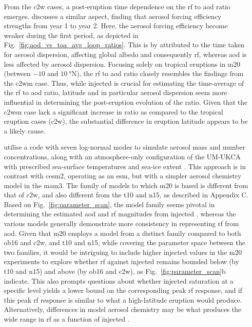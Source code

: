 \documentclass{ametsocV6.1}
\newcommand{\iso}[1][i]{{#1}njected \ce{SO2}}
\begin{document}
From the \gls{c2w} cases, a post-eruption time dependence on the \gls{rf} to \gls{aod}
ratio emerges. \citet{marshall2020} discusses a similar aspect, finding that aerosol
forcing efficiency strengths from year 1 to year 2. Here, the aerosol forcing efficiency
become weaker during the first period, as depicted in
Fig.~\ref{fig:aod_vs_toa_avg_loop_ratios}. This is by \citet{marshall2020} attributed to
the time taken for aerosol dispersion, affecting global albedo and consequently
\gls{rf}, whereas \gls{aod} is less affected by aerosol dispersion. Focusing solely on
tropical eruptions in \gls{m20} (between \(-10\) and \(\SI{10}{\degree\mathrm{N}}\)),
the \gls{rf} to \gls{aod} ratio closely resembles the findings from the \gls{c2wm} case.
Thus, while \iso{} is crucial for estimating the time-average of the \gls{rf} to
\gls{aod} ratio, latitude and in particular aerosol dispersion seem more influential in
determining the post-eruption evolution of the ratio. Given that the \gls{c2wsn} case
lack a significant increase in ratio as compared to the tropical eruption cases
(\gls{c2w}), the substantial difference in eruption latitude appears to be a likely
cause.

\citet{marshall2019, marshall2020, marshall2021} utilise a code with seven log-normal
modes to simulate aerosol mass and number concentrations, along with an atmosphere-only
configuration of the UM-UKCA with prescribed sea-surface temperatures and sea-ice extent
\citep{marshall2019}. This approach is in contrast with \gls{cesm2}, operating as an
\gls{esm}, but with a simpler aerosol chemistry model in the \gls{mam3}. The family of
models to which \gls{m20} is based is different from that of \gls{c2w}, and also
different from the \gls{t10} and \gls{n15}, as described in Appendix C. Based on
Fig.~\ref{fig:parameter_scan}, the model family seems pivotal in determining the
estimated \gls{aod} and \gls{rf} magnitudes from \iso{}, whereas the various models
generally demonstrate more consistency in representing \gls{rf} from \gls{aod}. Given
that \gls{m20} employs a model from a distinct family compared to both \gls{ob16} and
\gls{c2w}, and \gls{t10} and \gls{n15}, while covering the parameter space between the
two families, it would be intriguing to include higher \iso{} values in the \gls{m20}
experiments to explore whether \gls{rf} against \iso{} remains bounded below (by
\gls{t10} and \gls{n15}) and above (by \gls{ob16} and \gls{c2w}), as
Fig.~\ref{fig:parameter_scan}b indicate. This also prompts questions about whether
\iso{} saturation at a specific level yields a lower bound on the corresponding peak
\gls{rf} response, and if this peak \gls{rf} response is similar to what a high-latitude
eruption would produce. Alternatively, differences in model aerosol chemistry may be
what produces the wide range in \gls{rf} as a function of \iso{}.
\end{document}
